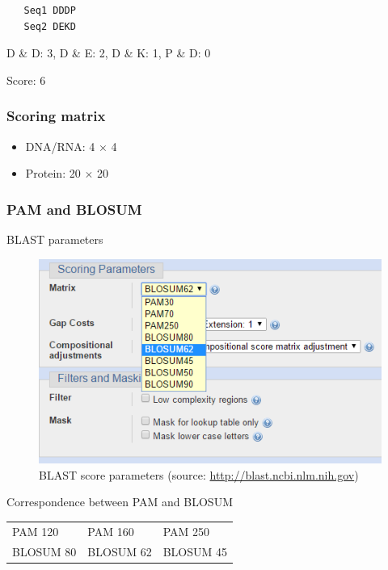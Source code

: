 \begin{verbatim}
   Seq1 DDDP
   Seq2 DEKD
\end{verbatim}

D \& D: 3, D \& E: 2, D \& K: 1, P \& D: 0

Score: 6

%
%
\subsubsection*{Scoring matrix}
\begin{itemize}
\item DNA/RNA: 4 $\times$ 4
\item Protein: 20 $\times$ 20
\end{itemize}

%
%
\subsubsection*{PAM and BLOSUM}

BLAST parameters

\begin{figure}[H]
  \centering
      \includegraphics[width=0.6 \textwidth]{fig11/blast_pam_blosum.png}
  \caption{BLAST score parameters (source: \href{http://blast.ncbi.nlm.nih.gov}{http://blast.ncbi.nlm.nih.gov})}
\end{figure}

\noindent
Correspondence between PAM and BLOSUM

\begin{table}[H]
\centering
\begin{tabular}{lll}
PAM 120    & PAM 160    & PAM 250    \\
BLOSUM 80 & BLOSUM 62 & BLOSUM 45
\end{tabular}
\end{table}

%
%
